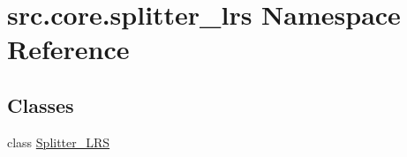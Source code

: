 \hypertarget{namespacesrc_1_1core_1_1splitter__lrs}{}\section{src.\+core.\+splitter\+\_\+lrs Namespace Reference}
\label{namespacesrc_1_1core_1_1splitter__lrs}
\subsection*{Classes}
\begin{DoxyCompactItemize}
\item 
class \hyperlink{classsrc_1_1core_1_1splitter__lrs_1_1Splitter__LRS}{Splitter\+\_\+\+L\+R\+S}
\end{DoxyCompactItemize}
